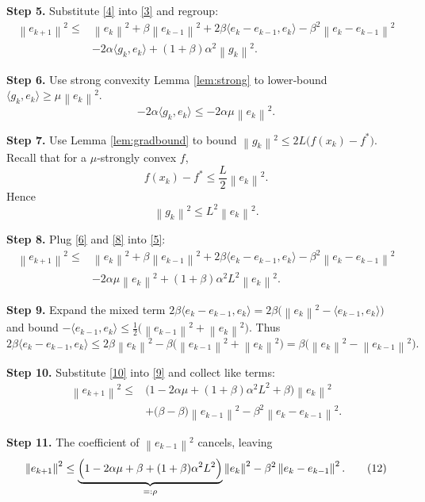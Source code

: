\documentclass{article}
\newcommand{\norm}[1]{\left\lVert #1 \right\rVert}
\newcommand{\ip}[2]{\langle #1,#2\rangle}
\begin{document}
\noindent\textbf{Step 5.}  Substitute \eqref{4} into \eqref{3} and regroup:
\[
\begin{aligned}
\norm{e_{k+1}}^{2}
\le &\norm{e_{k}}^{2}+ \beta\norm{e_{k-1}}^{2}
+2\beta\ip{e_{k}-e_{k-1}}{e_{k}}
-\beta^{2}\norm{e_{k}-e_{k-1}}^{2}\\
&-2\alpha\ip{g_{k}}{e_{k}}+(1+\beta)\alpha^{2}\norm{g_{k}}^{2}.
\end{aligned}
\tag{5}
\]

\noindent\textbf{Step 6.}  Use strong convexity Lemma \ref{lem:strong} to lower‑bound
$\ip{g_{k}}{e_{k}}\ge \mu\norm{e_{k}}^{2}$.
\[
-2\alpha\ip{g_{k}}{e_{k}}\le -2\alpha\mu\norm{e_{k}}^{2}.
\tag{6}
\]

\noindent\textbf{Step 7.}  Use Lemma \ref{lem:gradbound} to bound $\norm{g_{k}}^{2}\le 2L\bigl(f(x_{k})-f^{*}\bigr)$.
Recall that for a $\mu$‑strongly convex $f$,
\[
f(x_{k})-f^{*}\le \frac{L}{2}\norm{e_{k}}^{2}.
\tag{7}
\]
Hence
\[
\norm{g_{k}}^{2}\le L^{2}\norm{e_{k}}^{2}.
\tag{8}
\]

\noindent\textbf{Step 8.}  Plug \eqref{6} and \eqref{8} into \eqref{5}:
\[
\begin{aligned}
\norm{e_{k+1}}^{2}
\le &\norm{e_{k}}^{2}+ \beta\norm{e_{k-1}}^{2}
+2\beta\ip{e_{k}-e_{k-1}}{e_{k}}
-\beta^{2}\norm{e_{k}-e_{k-1}}^{2}\\
&-2\alpha\mu\norm{e_{k}}^{2}+(1+\beta)\alpha^{2}L^{2}\norm{e_{k}}^{2}.
\end{aligned}
\tag{9}
\]

\noindent\textbf{Step 9.}  Expand the mixed term $2\beta\ip{e_{k}-e_{k-1}}{e_{k}}=
2\beta\bigl(\norm{e_{k}}^{2}-\ip{e_{k-1}}{e_{k}}\bigr)$ and bound
$-\ip{e_{k-1}}{e_{k}}\le \tfrac12\bigl(\norm{e_{k-1}}^{2}+\norm{e_{k}}^{2}\bigr)$.
Thus
\[
2\beta\ip{e_{k}-e_{k-1}}{e_{k}}
\le 2\beta\norm{e_{k}}^{2}
-\beta\bigl(\norm{e_{k-1}}^{2}+\norm{e_{k}}^{2}\bigr)
= \beta\bigl(\norm{e_{k}}^{2}-\norm{e_{k-1}}^{2}\bigr).
\tag{10}
\]

\noindent\textbf{Step 10.}  Substitute \eqref{10} into \eqref{9} and collect like terms:
\[
\begin{aligned}
\norm{e_{k+1}}^{2}
\le &\bigl(1-2\alpha\mu+(1+\beta)\alpha^{2}L^{2}+\beta\bigr)\norm{e_{k}}^{2}\\
&+\bigl(\beta-\beta\bigr)\norm{e_{k-1}}^{2}
-\beta^{2}\norm{e_{k}-e_{k-1}}^{2}.
\end{aligned}
\tag{11}
\]

\noindent\textbf{Step 11.}  The coefficient of $\norm{e_{k-1}}^{2}$ cancels, leaving
\[
\norm{e_{k+1}}^{2}
\le \underbrace{\Bigl(1-2\alpha\mu+\beta+(1+\beta)\alpha^{2}L^{2}\Bigr)}_{=: \rho}\norm{e_{k}}^{2}
-\beta^{2}\norm{e_{k}-e_{k-1}}^{2}.
\tag{12}
\]
\end{document}
